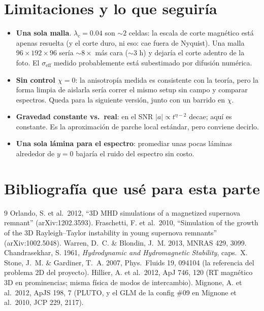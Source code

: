 \documentclass[11pt,a4paper]{article}
\begin{document}
\section{Limitaciones y lo que seguiría}

\begin{itemize}[nosep]
  \item \textbf{Una sola malla}. $\lambda_c=0.04$ son $\sim2$ celdas: la escala de corte
  magnético está apenas resuelta (y el corte duro, ni eso: cae fuera de Nyquist). Una
  malla $96\times192\times96$ sería $\sim8\times$ más cara ($\sim$3 h) y dejaría el corte
  adentro de la foto. El $\sigma_\mathrm{eff}$ medido probablemente está subestimado por
  difusión numérica.
  \item \textbf{Sin control $\chi=0$}: la anisotropía medida es consistente con la
  teoría, pero la forma limpia de aislarla sería correr el mismo setup sin campo y
  comparar espectros. Queda para la siguiente versión, junto con un barrido en $\chi$.
  \item \textbf{Gravedad constante vs.\ real}: en el SNR $|a|\propto t^{\eta-2}$ decae;
  aquí es constante. Es la aproximación de parche local estándar, pero conviene decirlo.
  \item \textbf{Una sola lámina para el espectro}: promediar unas pocas láminas alrededor
  de $y=0$ bajaría el ruido del espectro sin costo.
\end{itemize}

\section{Bibliografía que usé para esta parte}

\begin{thebibliography}{9}\small
{} Orlando, S. et al.\ 2012, ``3D MHD simulations of a magnetized
supernova remnant'' (arXiv:1202.3593).
 Fraschetti, F. et al.\ 2010, ``Simulation of the growth of the
3D Rayleigh--Taylor instability in young supernova remnants'' (arXiv:1002.5048).
 Warren, D.~C. \& Blondin, J.~M. 2013, MNRAS 429, 3099.
 Chandrasekhar, S. 1961, \emph{Hydrodynamic and Hydromagnetic
Stability}, caps.~X.
 Stone, J.~M. \& Gardiner, T.~A. 2007, Phys.\ Fluids 19, 094104
(la referencia del problema 2D del proyecto).
 Hillier, A. et al.\ 2012, ApJ 746, 120 (RT magnético 3D en
prominencias; misma física de modos de intercambio).
 Mignone, A. et al.\ 2012, ApJS 198, 7 (PLUTO, y el GLM de la
config \#09 en Mignone et al.\ 2010, JCP 229, 2117).
\end{thebibliography}
\end{document}
